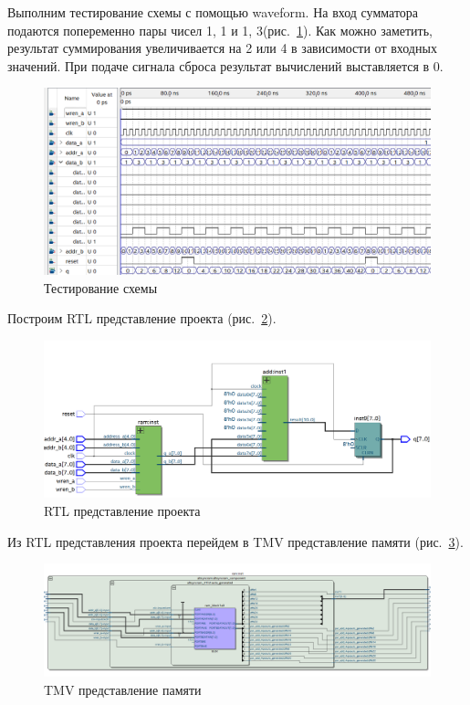 \documentclass[a4paper,14pt]{article}
\begin{document}
Выполним тестирование схемы с помощью waveform.
На вход сумматора подаются попеременно пары чисел 1, 1 и 1, 3(рис.~\ref{fig:wave}).
Как можно заметить, результат суммирования увеличивается на 2 или 4 в зависимости от входных значений.
При подаче сигнала сброса результат вычислений выставляется в 0.

\begin{figure}[H]
	\centering
	\includegraphics[width=\linewidth]{image/wave}
	\caption{Тестирование схемы}
	\label{fig:wave}
\end{figure}

Построим RTL представление проекта (рис.~\ref{fig:rtl}).

\begin{figure}[H]
	\centering
	\includegraphics[width=\linewidth]{image/rtl}
	\caption{RTL представление проекта}
	\label{fig:rtl}
\end{figure}

Из RTL представления проекта перейдем в TMV представление памяти (рис.~\ref{fig:tmv}).

\begin{figure}[H]
	\centering
	\includegraphics[width=\linewidth]{image/tmv}
	\caption{TMV представление памяти}
	\label{fig:tmv}
\end{figure}
\end{document}
